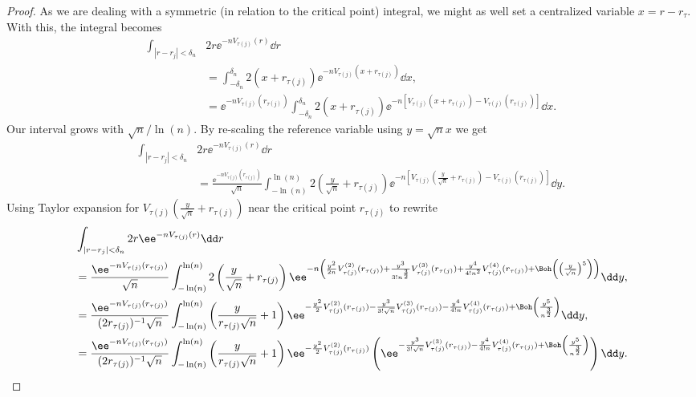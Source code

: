 \begin{proof}
	As we are dealing with a symmetric (in relation to the critical point) integral, we might as well set a centralized variable $x = r - r_\tau$. With this, the integral becomes
	\begin{align}
		\int_{|r - r_j| < \delta_n} & 2r \ee^{-n V_{\tau(j)}(r)} \dd r \\
		 & = \int_{-\delta_n}^{\delta_n} 2 (x + r_{\tau(j)}) \ee^{-n V_{\tau(j)}(x + r_{\tau(j)})} \dd x, \\
		& = \ee^{-n V_{\tau(j)}(r_{\tau(j)})}  \int_{-\delta_n}^{\delta_n} 2 (x + r_{\tau(j)}) \ee^{-n \left[ V_{\tau(j)}(x + r_{\tau(j)}) - V_{\tau(j)}(r_{\tau(j)})\right]} \dd x.
	\end{align}
	Our interval grows with $\sqrt{n}/\ln(n)$. By re-scaling the reference variable using $y = \sqrt{n} x$ we get
	\begin{align}
		\int_{|r - r_j| < \delta_n} & 2r \ee^{-n V_{\tau(j)}(r)} \dd r\\ 
		&= \frac{\ee^{-n V_{\tau(j)}(r_{\tau(j)})}}{\sqrt{n}}  \int_{-\ln(n)}^{\ln(n)} 2 \left(\frac{y}{\sqrt{n}} + r_{\tau(j)} \right) \ee^{-n \left[ V_{\tau(j)}(\frac{y}{\sqrt{n}} + r_{\tau(j)}) - V_{\tau(j)}(r_{\tau(j)})\right]} \dd y.
	\end{align}
	Using Taylor expansion for $V_{\tau(j)}\left(\frac{y}{\sqrt{n}} + r_{\tau(j)}\right )$ near the critical point $r_{\tau(j)}$ to rewrite 
	\begin{align}
		& \int_{|r - r_j| < \delta_n} 2r \ee^{-n V_{\tau(j)}(r)} \dd r\\ 
		&  =\frac{\ee^{-n V_{\tau(j)}(r_{\tau(j)})}}{\sqrt{n}}  \int_{-\ln(n)}^{\ln(n)} 2 \left(\frac{y}{\sqrt{n}} + r_{\tau(j)} \right) \ee^{-n \left(\frac{y^2}{2n} V^{(2)}_{\tau(j)}(r_{\tau(j)}) + \frac{y^3}{3! n^{\frac{3}{2}}} V^{(3)}_{\tau(j)}(r_{\tau(j)}) + \frac{y^4}{4! n^2} V^{(4)}_{\tau(j)}(r_{\tau(j)})+ \Boh\left(\left(\frac{y}{\sqrt{n}}\right)^5\right) \right)} \dd y, \\
		& = \frac{\ee^{-n V_{\tau(j)}(r_{\tau(j)})}}{(2 r_{\tau(j)} )^{-1}\sqrt{n}}  \int_{-\ln(n)}^{\ln(n)} \left(\frac{y}{r_{\tau(j)}\sqrt{n}} + 1 \right) \ee^{-\frac{y^2}{2} V^{(2)}_{\tau(j)}(r_{\tau(j)}) - \frac{y^3}{3! \sqrt{n}} V^{(3)}_{\tau(j)}(r_{\tau(j)}) - \frac{y^4}{4! n} V^{(4)}_{\tau(j)}(r_{\tau(j)}) + \Boh\left(\frac{y^5}{n^\frac{3}{2}}\right)} \dd y, \\
		& = \frac{\ee^{-n V_{\tau(j)}(r_{\tau(j)})}}{(2 r_{\tau(j)} )^{-1}\sqrt{n}}  \int_{-\ln(n)}^{\ln(n)} \left(\frac{y}{r_{\tau(j)}\sqrt{n}} + 1 \right) \ee^{-\frac{y^2}{2} V^{(2)}_{\tau(j)}(r_{\tau(j)})} \left(\ee^{- \frac{y^3}{3! \sqrt{n}} V^{(3)}_{\tau(j)}(r_{\tau(j)}) - \frac{y^4}{4! n} V^{(4)}_{\tau(j)}(r_{\tau(j)}) + \Boh\left(\frac{y^5}{n^\frac{3}{2}}\right)}\right) \dd y.

\end{align}
\end{proof}
